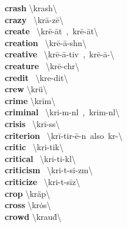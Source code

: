 \documentclass[10pt,a4paper]{article}
\begin{document}
\begin{multicols}{2}
\textbf{ crash }\quad \textbackslash \textprimstress krash\textbackslash \\
\textbf{ crazy }\quad \ \textbackslash \textprimstress kr\={a}-z\={e}\textbackslash \\
\textbf{ create }\quad \ \textbackslash kr\={e}-\textprimstress \={a}t\ ,\ \textprimstress kr\={e}-\textsecstress \={a}t\textbackslash \\
\textbf{ creation }\quad \ \textbackslash kr\={e}-\textprimstress \={a}-sh\textschwa n\textbackslash \\
\textbf{ creative }\quad \ \textbackslash kr\={e}-\textprimstress \={a}-tiv\ ,\ \textprimstress kr\={e}-\textsecstress \={a}-\textbackslash \\
\textbf{ creature }\quad \ \textbackslash \textprimstress kr\={e}-ch\textschwa r\textbackslash \\
\textbf{ credit }\quad \ \textbackslash \textprimstress kre-dit\textbackslash \\
\textbf{ crew }\quad \textbackslash \textprimstress kr\"{u}\textbackslash \\
\textbf{ crime }\quad \textbackslash \textprimstress kr\={i}m\textbackslash \\
\textbf{ criminal }\quad \ \textbackslash \textprimstress kri-m\textschwa -n\textsuperscript{\textreve}l\ ,\ \textprimstress krim-n\textschwa l\textbackslash \\
\textbf{ crisis }\quad \ \textbackslash \textprimstress kr\={i}-s\textschwa s\textbackslash \\
\textbf{ criterion }\quad \ \textbackslash kr\={i}-\textprimstress tir-\={e}-\textschwa n\ also\ kr\textschwa -\textbackslash \\
\textbf{ critic }\quad \ \textbackslash \textprimstress kri-tik\textbackslash \\
\textbf{ critical }\quad \ \textbackslash \textprimstress kri-ti-k\textschwa l\textbackslash \\
\textbf{ criticism }\quad \ \textbackslash \textprimstress kri-t\textschwa -\textsecstress si-z\textschwa m\textbackslash \\
\textbf{ criticize }\quad \ \textbackslash \textprimstress kri-t\textschwa -\textsecstress s\={i}z\textbackslash \\
\textbf{ crop }\quad \textbackslash \textprimstress kr\"{a}p\textbackslash \\
\textbf{ cross }\quad \textbackslash \textprimstress kr\.{o}s\textbackslash \\
\textbf{ crowd }\quad \textbackslash \textprimstress krau\. d\textbackslash \\

\end{multicols}
\end{document}

